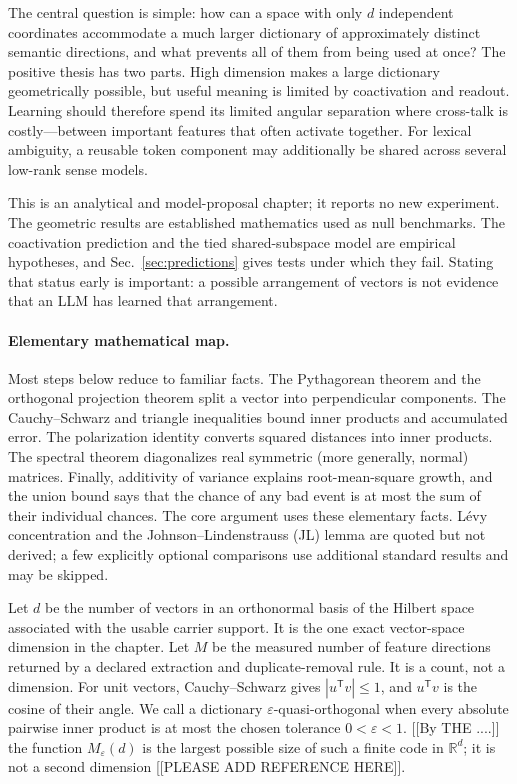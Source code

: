 \documentclass[
  aps,
  reprint,
  superscriptaddress,
  floatfix,
  nofootinbib,
  longbibliography
]{revtex4-2}
\newcommand{\R}{\mathbb{R}}
\newcommand{\Msem}{M}
\newcommand{\T}{^{\mathsf{T}}}
\begin{document}
The central question is simple: how can a space with only $d$ independent
coordinates accommodate a much larger dictionary of approximately distinct
semantic directions, and what prevents all of them from being used at once?
The positive thesis has two parts.  High dimension makes a large dictionary
geometrically possible, but useful meaning is limited by coactivation and
readout.  Learning should therefore spend its limited angular separation where
cross-talk is costly---between important features that often activate
together.  For lexical ambiguity, a reusable token component may additionally
be shared across several low-rank sense models.

This is an analytical and model-proposal chapter; it reports no new experiment.
The geometric results are established mathematics used as null benchmarks.
The coactivation prediction and the tied shared-subspace model are empirical
hypotheses, and Sec.~\ref{sec:predictions} gives tests under which they fail.
Stating that status early is important: a possible arrangement of vectors is
not evidence that an LLM has learned that arrangement.

\paragraph{Elementary mathematical map.}
Most steps below reduce to familiar facts.  The Pythagorean
theorem and the orthogonal projection theorem split a vector into perpendicular
components.  The Cauchy--Schwarz and triangle inequalities bound inner products
and accumulated error.  The polarization identity converts squared distances
into inner products.  The spectral theorem diagonalizes real symmetric (more generally, normal)
matrices.  Finally, additivity of variance explains root-mean-square growth,
and the union bound says that the chance of any bad event is at most the sum of
their individual chances.  The core argument uses these elementary facts.
L\'evy concentration and the Johnson--Lindenstrauss (JL) lemma are quoted but not derived;
a few explicitly optional comparisons use additional standard results and may
be skipped.

Let $d$ be the number of vectors in an orthonormal basis of the Hilbert space associated with the usable carrier support.
It is the one exact vector-space dimension in the chapter.  Let $\Msem$ be the
measured number of feature directions returned by a declared extraction and
duplicate-removal rule.  It is a count, not a dimension.  For unit vectors,
Cauchy--Schwarz gives $|u\T v|\leq1$, and $u\T v$ is the cosine of their angle.
We call a dictionary $\varepsilon$-quasi-orthogonal when every absolute
pairwise inner product is at most the chosen tolerance
$0<\varepsilon<1$.  [[By THE ....]] the function $M_\varepsilon(d)$ is the largest possible
size of such a finite code in $\R^d$; it is not a second dimension [[PLEASE ADD REFERENCE HERE]].
\end{document}
